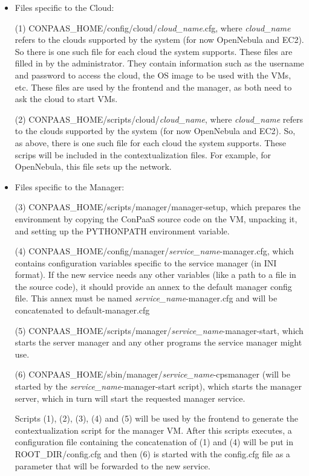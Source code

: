 \documentclass[10pt]{article}
\begin{document}
\begin{itemize}
\item Files specific to the Cloud:

(1) \textdollar CONPAAS\_HOME/config/cloud/\textit{cloud\_name}.cfg, where \textit{cloud\_name} refers to the clouds supported by the system (for now OpenNebula and EC2). So there is one such file for each cloud the system supports. These files are filled in by the administrator. They contain information such as the username and password to access the cloud, the OS image to be used with the VMs, etc. These files are used by the frontend and the manager, as both need to ask the cloud to start VMs. 

(2) \textdollar CONPAAS\_HOME/scripts/cloud/\textit{cloud\_name}, where \textit{cloud\_name} refers to the clouds supported by the system (for now OpenNebula and EC2). So, as above, there is one such file for each cloud the system supports. These scrips will be included in the contextualization files. For example, for OpenNebula, this file sets up the network. 

\item Files specific to the Manager:

(3) \textdollar CONPAAS\_HOME/scripts/manager/manager-setup, which prepares the environment by copying the ConPaaS source code on the VM, unpacking it, and setting up the PYTHONPATH environment variable.

(4) \textdollar CONPAAS\_HOME/config/manager/\textit{service\_name}-manager.cfg, which contains configuration variables specific to the service manager (in INI format). If the new service needs any other variables (like a path to a file in the source code), it should provide an annex to the default manager config file. This annex must be named \textit{service\_name}-manager.cfg and will be concatenated to default-manager.cfg

(5) \textdollar CONPAAS\_HOME/scripts/manager/\textit{service\_name}-manager-start, which starts the server manager and any other programs the service manager might use. 

(6) \textdollar CONPAAS\_HOME/sbin/manager/\textit{service\_name}-cpsmanager (will be started by the \textit{service\_name}-manager-start script), which starts the manager server, which in turn will start the requested manager service.

Scripts (1), (2), (3), (4) and (5) will be used by the frontend to generate the contextualization script for the manager VM. After this scripts executes, a configuration file containing the concatenation of (1) and (4) will be put in \textdollar ROOT\_DIR/config.cfg and then (6) is started with the config.cfg file as a parameter that will be forwarded to the new service.


\end{itemize}
\end{document}
